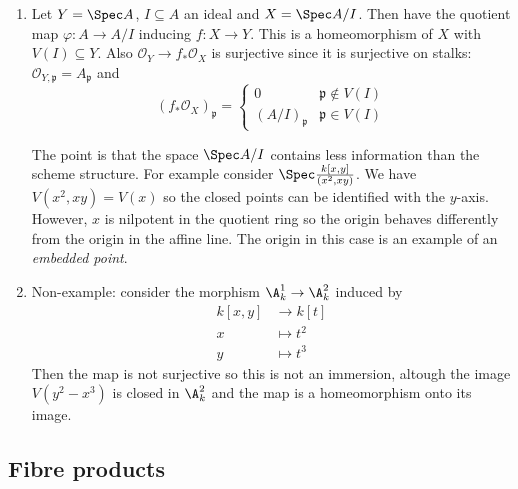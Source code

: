 \documentclass[a4paper]{article}
\newcommand{\sh}[1]{\mathcal{#1}} %
\begin{document}
\begin{eg}\leavevmode
  \begin{enumerate}
  \item Let \(Y = \Spec A\), \(I \subseteq A\) an ideal and \(X = \Spec A/I\). Then have the quotient map \(\varphi: A \to A/I\) inducing \(f: X \to Y\). This is a homeomorphism of \(X\) with \(V(I) \subseteq Y\). Also \(\sh O_Y \to f_* \sh O_X\) is surjective since it is surjective on stalks: \(\sh O_{Y, \mathfrak p} = A_{\mathfrak p}\) and
    \[
      (f_* \sh O_X)_{\mathfrak p} =
      \begin{cases}
        0 & \mathfrak p \notin V(I) \\
        (A/I)_{\mathfrak p} & \mathfrak p \in V(I)
      \end{cases}
    \]

    The point is that the space \(\Spec A/I\) contains less information than the scheme structure. For example consider \(\Spec \frac{k[x, y]}{(x^2, xy)}\). We have \(V(x^2, xy) = V(x)\) so the closed points can be identified with the \(y\)-axis. However, \(x\) is nilpotent in the quotient ring so the origin behaves differently from the origin in the affine line. The origin in this case is an example of an \emph{embedded point}.
  \item Non-example: consider the morphism \(\A_k^1 \to \A_k^2\) induced by
    \begin{align*}
      k[x, y] &\to k[t] \\
      x &\mapsto t^2 \\
      y &\mapsto t^3
    \end{align*}
    Then the map is not surjective so this is not an immersion, altough the image \(V(y^2 - x^3)\) is closed in \(\A^2_k\) and the map is a homeomorphism onto its image.
  \end{enumerate}
\end{eg}

\subsection{Fibre products}
\end{document}
